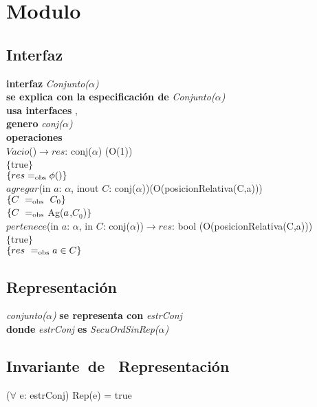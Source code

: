 \section*{Modulo }

\subsection*{Interfaz}
\textbf{interfaz} \textit{Conjunto($\alpha$)}\\
\textbf{se explica con la especificaci\'on de} \textit{Conjunto($\alpha$)}\\
\textbf{usa interfaces} , \\
\textbf{genero} \textit{conj($\alpha$)}\\

\textbf{operaciones}\\

$Vacio$()$\longrightarrow res$: conj($\alpha$) \hfill (O(1)) \\
$\{$true$\}$\\
$\{{res} =_{\mathrm{obs}} \phi()\}$\\

$agregar$(in $a$: $\alpha$, inout $C$: conj($\alpha$))\hfill (O(posicionRelativa(C,a))) \\
$\{\sombreritoWide{C}\ \igobs\ C_0\}$\\
$\{{C}\ =_{\mathrm{obs}}$ Ag(${a}$,$C_0$)$\}$\\

$pertenece$(in $a$: $\alpha$, in $C$: conj($\alpha$))$\longrightarrow res$: bool \hfill (O(posicionRelativa(C,a))) \\
$\{$true$\}$\\
$\{{res}\ =_{\mathrm{obs}} {a}\in {C}\}$\\

\subsection*{Representaci\'on}
\textit{conjunto($\alpha$)} \textbf{se representa con} \textit{estrConj}\\
\textbf{donde} \textit{estrConj} \textbf{es} \textit{SecuOrdSinRep($\alpha$)}\\

\subsection*{Invariante\ de \ Representaci\'on}
\vspace{11pt}
($\forall$ e: estrConj) Rep(e) = true
\vspace{33pt}

